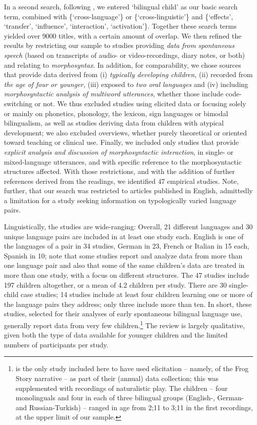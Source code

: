 \documentclass[output=paper]{langscibook}
\begin{document}
In a second search, following \citet{VanDijkEtAl2022}, we entered ‘bilingual child’ as our basic search term, combined with \{‘cross-language’\} or \{‘cross-linguistic’\} and \{‘effects’, ‘transfer’, ‘influence’, ‘interaction’, ‘activation’\}. Together these search terms yielded over 9000 titles, with a certain amount of overlap. We then refined the results by restricting our sample to studies providing \textit{data from spontaneous speech} (based on transcripts of audio- or video-recordings, diary notes, or both) and relating to \textit{morphosyntax}. In addition, for comparability, we chose sources that provide data derived from (i) \textit{typically developing children,} (ii) recorded from \textit{the} \textit{age of four or younger,} (iii) exposed to \textit{two oral languages} and (iv) including \textit{morphosyntactic analysis of multiword utterances}, whether those include code-switching or not. We thus excluded studies using elicited data or focusing solely or mainly on phonetics, phonology, the lexicon, sign languages or bimodal bilingualism, as well as studies deriving data from children with atypical development; we also excluded overviews, whether purely theoretical or oriented toward teaching or clinical use. Finally, we included only studies that provide \textit{explicit analysis and discussion of morphosyntactic interaction}, in single- or mixed-language utterances, and with specific reference to the morphosyntactic structures affected. With those restrictions, and with the addition of further references derived from the readings, we identified 47 empirical studies. Note, further, that our search was restricted to articles published in English, admittedly a limitation for a study seeking information on typologically varied language pairs.

Linguistically, the studies are wide-ranging: Overall, 21 different languages and 30 unique language pairs are included in at least one study each. English is one of the languages of a pair in 34 studies, German in 23, French or Italian in 15 each, Spanish in 10; note that some studies report and analyze data from more than one language pair and also that some of the same children’s data are treated in more than one study, with a focus on different structures. The 47 studies include 197 children altogether, or a mean of 4.2 children per study. There are 30 single-child case studies; 14 studies include at least four children learning one or more of the language pairs they address; only three include more than ten. In short, these studies, selected for their analyses of early spontaneous bilingual language use, generally report data from very few children.\footnote{\citet{SağınŞimşekAntonovaÜnlü2021} is the only study included here to have used elicitation – namely, of the Frog Story narrative \citep{Mayer1969} – as part of their (annual) data collection; this was supplemented with recordings of naturalistic play. The children – four monolinguals and four in each of three bilingual groups (English-, German- and Russian-Turkish) – ranged in age from 2;11 to 3;11 in the first recordings, at the upper limit of our sample.} The review is largely qualitative, given both the type of data available for younger children and the limited numbers of participants per study.
\end{document}
